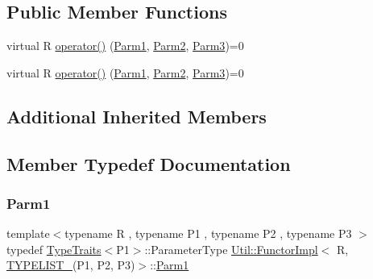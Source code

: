 \subsection*{Public Member Functions}
\begin{DoxyCompactItemize}
\item 
virtual R \mbox{\hyperlink{classUtil_1_1FunctorImpl_3_01R_00_01TYPELIST__3_07P1_00_01P2_00_01P3_08_4_a80ceaa256d42f98c4523dea840906200}{operator()}} (\mbox{\hyperlink{structUtil_1_1Private_1_1FunctorImplBase_a9d61e693d6c616dea5bd9d9073c7d21a}{Parm1}}, \mbox{\hyperlink{structUtil_1_1Private_1_1FunctorImplBase_a554085cd798ef14838a59b528f0feb2e}{Parm2}}, \mbox{\hyperlink{structUtil_1_1Private_1_1FunctorImplBase_a052148e627fd4caecbcffdbdf1033dbb}{Parm3}})=0
\item 
virtual R \mbox{\hyperlink{classUtil_1_1FunctorImpl_3_01R_00_01TYPELIST__3_07P1_00_01P2_00_01P3_08_4_a80ceaa256d42f98c4523dea840906200}{operator()}} (\mbox{\hyperlink{structUtil_1_1Private_1_1FunctorImplBase_a9d61e693d6c616dea5bd9d9073c7d21a}{Parm1}}, \mbox{\hyperlink{structUtil_1_1Private_1_1FunctorImplBase_a554085cd798ef14838a59b528f0feb2e}{Parm2}}, \mbox{\hyperlink{structUtil_1_1Private_1_1FunctorImplBase_a052148e627fd4caecbcffdbdf1033dbb}{Parm3}})=0
\end{DoxyCompactItemize}
\subsection*{Additional Inherited Members}


\subsection{Member Typedef Documentation}
\mbox{\label{classUtil_1_1FunctorImpl_3_01R_00_01TYPELIST__3_07P1_00_01P2_00_01P3_08_4_af62467f5d0a091d03f5db9c7fbeb1f96}} 
\subsubsection{\texorpdfstring{Parm1}{Parm1}\hspace{0.1cm}{\footnotesize\ttfamily [1/2]}}
{\footnotesize\ttfamily template$<$typename R , typename P1 , typename P2 , typename P3 $>$ \\
typedef \mbox{\hyperlink{classUtil_1_1TypeTraits}{Type\+Traits}}$<$P1$>$\+::Parameter\+Type \mbox{\hyperlink{classUtil_1_1FunctorImpl}{Util\+::\+Functor\+Impl}}$<$ R, \mbox{\hyperlink{install_2include_2adat_2typelist_8h_a0309f68a543c5c0994f9edc0e56dc59f}{T\+Y\+P\+E\+L\+I\+S\+T\+\_}}(P1, P2, P3)$>$\+::\mbox{\hyperlink{structUtil_1_1Private_1_1FunctorImplBase_a9d61e693d6c616dea5bd9d9073c7d21a}{Parm1}}}

